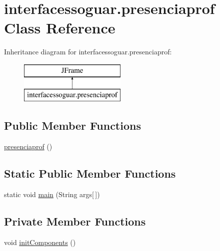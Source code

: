\hypertarget{classinterfacessoguar_1_1presenciaprof}{}\section{interfacessoguar.\+presenciaprof Class Reference}
\label{classinterfacessoguar_1_1presenciaprof}
Inheritance diagram for interfacessoguar.\+presenciaprof\+:\begin{figure}[H]
\begin{center}
\leavevmode
\includegraphics[height=2.000000cm]{classinterfacessoguar_1_1presenciaprof}
\end{center}
\end{figure}
\subsection*{Public Member Functions}
\begin{DoxyCompactItemize}
\item 
\mbox{\hyperlink{classinterfacessoguar_1_1presenciaprof_a9e4f31169325b49b5313434193252dff}{presenciaprof}} ()
\end{DoxyCompactItemize}
\subsection*{Static Public Member Functions}
\begin{DoxyCompactItemize}
\item 
static void \mbox{\hyperlink{classinterfacessoguar_1_1presenciaprof_ae0e3372322cf15d74092300caff9b031}{main}} (String args\mbox{[}$\,$\mbox{]})
\end{DoxyCompactItemize}
\subsection*{Private Member Functions}
\begin{DoxyCompactItemize}
\item 
void \mbox{\hyperlink{classinterfacessoguar_1_1presenciaprof_a4bf8f354badc97d4f80931e90dd84113}{init\+Components}} ()
\end{DoxyCompactItemize}
